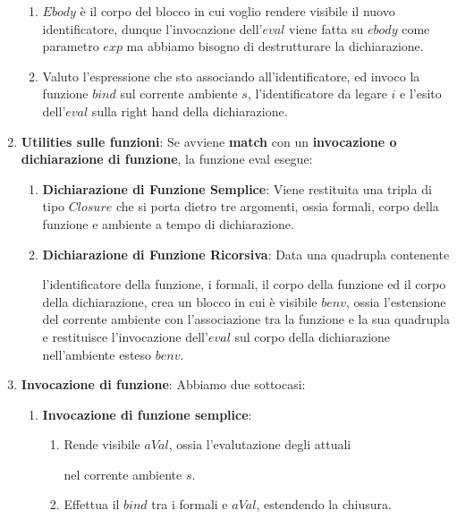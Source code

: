 \documentclass{article}
\begin{document}
\begin{enumerate}
    \begin{enumerate}
        \item $Ebody$ è il corpo del blocco in cui voglio rendere visibile il nuovo identificatore, dunque l'invocazione dell'$eval$ viene fatta su $ebody$ come parametro $exp$ ma abbiamo bisogno di destrutturare la dichiarazione.
        \item Valuto l'espressione che sto associando all'identificatore, ed invoco la funzione $bind$ sul corrente ambiente $s$, l'identificatore da legare $i$ e l'esito dell'$eval$ sulla right hand della dichiarazione.
    \end{enumerate}

    \item \textbf{Utilities sulle funzioni}: Se avviene \textbf{match} con un \textbf{invocazione o dichiarazione di funzione}, la funzione eval esegue:

    \begin{enumerate}
        \item \textbf{Dichiarazione di Funzione Semplice}: Viene restituita una tripla di tipo $Closure$ che si porta dietro tre argomenti, ossia formali, corpo della funzione e ambiente a tempo di dichiarazione.
        \item \textbf{Dichiarazione di Funzione Ricorsiva}: Data una quadrupla contenente 
        
        l'identificatore della funzione, i formali,
        il corpo della funzione ed il corpo della dichiarazione, crea un blocco in cui è visibile $benv$, ossia l'estensione del corrente ambiente con l'associazione tra la funzione e la sua quadrupla e restituisce l'invocazione dell'$eval$ sul corpo della dichiarazione nell'ambiente esteso $benv$.
    \end{enumerate}

    \newpage

    \item \textbf{Invocazione di funzione}: Abbiamo due sottocasi:
    \begin{enumerate}
        \item \textbf{Invocazione di funzione semplice}:
        \begin{enumerate}
            \item Rende visibile $aVal$, ossia l'evalutazione degli attuali 
            
            nel corrente ambiente $s$.
            \item Effettua il $bind$ tra i formali e $aVal$, estendendo la chiusura. 
            

\end{enumerate}
\end{enumerate}
\end{enumerate}
\end{document}
